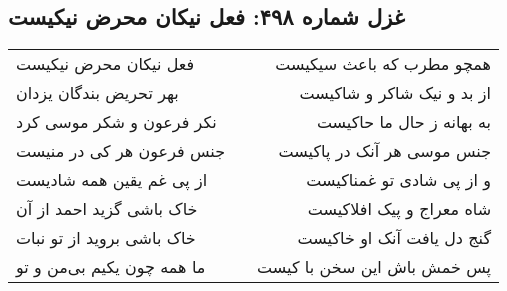\begin{center}
\section*{غزل شماره ۴۹۸: فعل نیکان محرض نیکیست}
\label{sec:0498}
\begin{longtable}{l p{0.5cm} r}
فعل نیکان محرض نیکیست
&&
همچو مطرب که باعث سیکیست
\\
بهر تحریض بندگان یزدان
&&
از بد و نیک شاکر و شاکیست
\\
نکر فرعون و شکر موسی کرد
&&
به بهانه ز حال ما حاکیست
\\
جنس فرعون هر کی در منیست
&&
جنس موسی هر آنک در پاکیست
\\
از پی غم یقین همه شادیست
&&
و از پی شادی تو غمناکیست
\\
خاک باشی گزید احمد از آن
&&
شاه معراج و پیک افلاکیست
\\
خاک باشی بروید از تو نبات
&&
گنج دل یافت آنک او خاکیست
\\
ما همه چون یکیم بی‌من و تو
&&
پس خمش باش این سخن با کیست
\\
\end{longtable}
\end{center}
